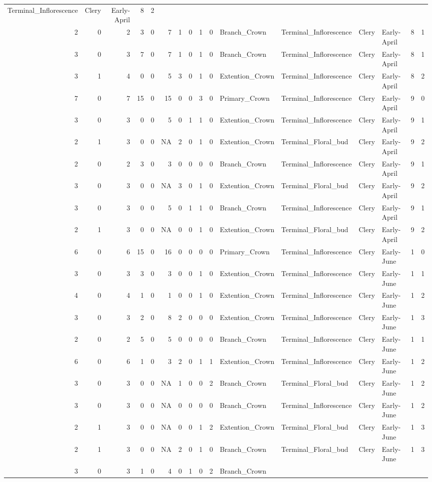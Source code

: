 \documentclass[]{article}
\begin{document}
\begin{longtable}[]{@{}rrrrrrrrrrllllrl@{}}
Terminal\_Inflorescence & Clery & Early-April & 8 & 2\tabularnewline
2 & 0 & 2 & 3 & 0 & 7 & 1 & 0 & 1 & 0 & Branch\_Crown &
Terminal\_Inflorescence & Clery & Early-April & 8 & 1\tabularnewline
3 & 0 & 3 & 7 & 0 & 7 & 1 & 0 & 1 & 0 & Branch\_Crown &
Terminal\_Inflorescence & Clery & Early-April & 8 & 1\tabularnewline
3 & 1 & 4 & 0 & 0 & 5 & 3 & 0 & 1 & 0 & Extention\_Crown &
Terminal\_Inflorescence & Clery & Early-April & 8 & 2\tabularnewline
7 & 0 & 7 & 15 & 0 & 15 & 0 & 0 & 3 & 0 & Primary\_Crown &
Terminal\_Inflorescence & Clery & Early-April & 9 & 0\tabularnewline
3 & 0 & 3 & 0 & 0 & 5 & 0 & 1 & 1 & 0 & Extention\_Crown &
Terminal\_Inflorescence & Clery & Early-April & 9 & 1\tabularnewline
2 & 1 & 3 & 0 & 0 & NA & 2 & 0 & 1 & 0 & Extention\_Crown &
Terminal\_Floral\_bud & Clery & Early-April & 9 & 2\tabularnewline
2 & 0 & 2 & 3 & 0 & 3 & 0 & 0 & 0 & 0 & Branch\_Crown &
Terminal\_Inflorescence & Clery & Early-April & 9 & 1\tabularnewline
3 & 0 & 3 & 0 & 0 & NA & 3 & 0 & 1 & 0 & Extention\_Crown &
Terminal\_Floral\_bud & Clery & Early-April & 9 & 2\tabularnewline
3 & 0 & 3 & 0 & 0 & 5 & 0 & 1 & 1 & 0 & Branch\_Crown &
Terminal\_Inflorescence & Clery & Early-April & 9 & 1\tabularnewline
2 & 1 & 3 & 0 & 0 & NA & 0 & 0 & 1 & 0 & Extention\_Crown &
Terminal\_Floral\_bud & Clery & Early-April & 9 & 2\tabularnewline
6 & 0 & 6 & 15 & 0 & 16 & 0 & 0 & 0 & 0 & Primary\_Crown &
Terminal\_Inflorescence & Clery & Early-June & 1 & 0\tabularnewline
3 & 0 & 3 & 3 & 0 & 3 & 0 & 0 & 1 & 0 & Extention\_Crown &
Terminal\_Inflorescence & Clery & Early-June & 1 & 1\tabularnewline
4 & 0 & 4 & 1 & 0 & 1 & 0 & 0 & 1 & 0 & Extention\_Crown &
Terminal\_Inflorescence & Clery & Early-June & 1 & 2\tabularnewline
3 & 0 & 3 & 2 & 0 & 8 & 2 & 0 & 0 & 0 & Extention\_Crown &
Terminal\_Inflorescence & Clery & Early-June & 1 & 3\tabularnewline
2 & 0 & 2 & 5 & 0 & 5 & 0 & 0 & 0 & 0 & Branch\_Crown &
Terminal\_Inflorescence & Clery & Early-June & 1 & 1\tabularnewline
6 & 0 & 6 & 1 & 0 & 3 & 2 & 0 & 1 & 1 & Extention\_Crown &
Terminal\_Inflorescence & Clery & Early-June & 1 & 2\tabularnewline
3 & 0 & 3 & 0 & 0 & NA & 1 & 0 & 0 & 2 & Branch\_Crown &
Terminal\_Floral\_bud & Clery & Early-June & 1 & 2\tabularnewline
3 & 0 & 3 & 0 & 0 & NA & 0 & 0 & 0 & 0 & Branch\_Crown &
Terminal\_Inflorescence & Clery & Early-June & 1 & 2\tabularnewline
2 & 1 & 3 & 0 & 0 & NA & 0 & 0 & 1 & 2 & Extention\_Crown &
Terminal\_Floral\_bud & Clery & Early-June & 1 & 3\tabularnewline
2 & 1 & 3 & 0 & 0 & NA & 2 & 0 & 1 & 0 & Branch\_Crown &
Terminal\_Floral\_bud & Clery & Early-June & 1 & 3\tabularnewline
3 & 0 & 3 & 1 & 0 & 4 & 0 & 1 & 0 & 2 & Branch\_Crown &

\end{longtable}
\end{document}
